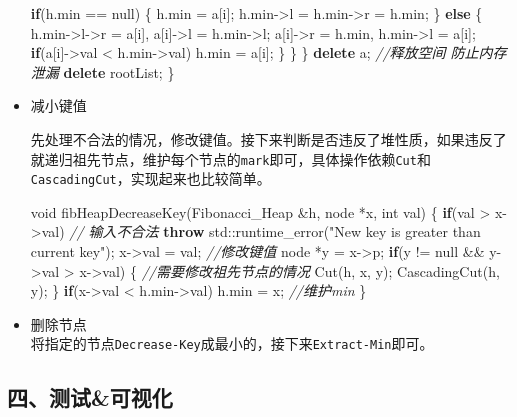\documentclass[]{article}
\newenvironment{Shaded}{}{}
\newcommand{\BuiltInTok}[1]{#1}
\newcommand{\CommentTok}[1]{\textcolor[rgb]{0.38,0.63,0.69}{\textit{#1}}}
\newcommand{\ControlFlowTok}[1]{\textcolor[rgb]{0.00,0.44,0.13}{\textbf{#1}}}
\newcommand{\DataTypeTok}[1]{\textcolor[rgb]{0.56,0.13,0.00}{#1}}
\newcommand{\KeywordTok}[1]{\textcolor[rgb]{0.00,0.44,0.13}{\textbf{#1}}}
\newcommand{\NormalTok}[1]{#1}
\newcommand{\StringTok}[1]{\textcolor[rgb]{0.25,0.44,0.63}{#1}}
\begin{document}
\begin{itemize}
\begin{Shaded}
\begin{Highlighting}[]
            \ControlFlowTok{if}\NormalTok{(h.min == null) \{}
\NormalTok{                h.min = a[i];}
\NormalTok{                h.min->l = h.min->r = h.min;}
\NormalTok{            \}}
            \ControlFlowTok{else}\NormalTok{ \{}
\NormalTok{                h.min->l->r = a[i], a[i]->l = h.min->l;}
\NormalTok{                a[i]->r = h.min, h.min->l = a[i];}
                \ControlFlowTok{if}\NormalTok{(a[i]->val < h.min->val) h.min = a[i];}
\NormalTok{            \}}
\NormalTok{        \}}
\NormalTok{    \}}
    \KeywordTok{delete}\NormalTok{ a; }\CommentTok{//释放空间 防止内存泄漏}
    \KeywordTok{delete}\NormalTok{ rootList;}
\NormalTok{\}}
\end{Highlighting}
\end{Shaded}
\item
  减小键值

  先处理不合法的情况，修改键值。接下来判断是否违反了堆性质，如果违反了就递归祖先节点，维护每个节点的\texttt{mark}即可，具体操作依赖\texttt{Cut}和\texttt{CascadingCut}，实现起来也比较简单。

\begin{Shaded}
\begin{Highlighting}[]
\DataTypeTok{void}\NormalTok{ fibHeapDecreaseKey(Fibonacci_Heap &h, node *x, }\DataTypeTok{int}\NormalTok{ val) \{}
    \ControlFlowTok{if}\NormalTok{(val > x->val) }\CommentTok{// 输入不合法}
        \ControlFlowTok{throw} \BuiltInTok{std::}\NormalTok{runtime_error(}\StringTok{"New key is greater than current key"}\NormalTok{);}
\NormalTok{    x->val = val; }\CommentTok{//修改键值}
\NormalTok{    node *y = x->p;}
    \ControlFlowTok{if}\NormalTok{(y != null && y->val > x->val) \{ }\CommentTok{//需要修改祖先节点的情况}
\NormalTok{        Cut(h, x, y);}
\NormalTok{        CascadingCut(h, y);}
\NormalTok{    \}}
    \ControlFlowTok{if}\NormalTok{(x->val < h.min->val) h.min = x; }\CommentTok{//维护min}
\NormalTok{\}}
\end{Highlighting}
\end{Shaded}
\item
  删除节点\\
  将指定的节点\texttt{Decrease-Key}成最小的，接下来\texttt{Extract-Min}即可。
\end{itemize}

\hypertarget{header-n104}{%
\subsection{四、测试\&可视化}\label{header-n104}}
\end{document}
